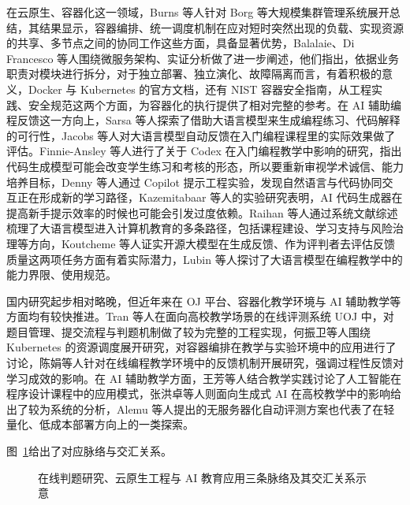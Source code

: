 在云原生、容器化这一领域，Burns 等人针对 Borg 等大规模集群管理系统展开总结，其结果显示，容器编排、统一调度机制在应对短时突然出现的负载、实现资源的共享、多节点之间的协同工作这些方面，具备显著优势\cite{burns2016borg}，Balalaie、Di Francesco 等人围绕微服务架构、实证分析做了进一步阐述，他们指出，依据业务职责对模块进行拆分，对于独立部署、独立演化、故障隔离而言，有着积极的意义\cite{balalaie2016microservices,difrancesco2019microservices}，Docker 与 Kubernetes 的官方文档，还有 NIST 容器安全指南，从工程实践、安全规范这两个方面，为容器化的执行提供了相对完整的参考\cite{dockerdocs,kubernetesdocs,nist201716800190}。在 AI 辅助编程反馈这一方向上，Sarsa 等人探索了借助大语言模型来生成编程练习、代码解释的可行性\cite{sarsa2022llm}，Jacobs 等人对大语言模型自动反馈在入门编程课程里的实际效果做了评估\cite{jacobs2024feedback}。Finnie-Ansley 等人进行了关于 Codex 在入门编程教学中影响的研究，指出代码生成模型可能会改变学生练习和考核的形态，所以要重新审视学术诚信、能力培养目标\cite{finnieansley2022robots}，Denny 等人通过 Copilot 提示工程实验，发现自然语言与代码协同交互正在形成新的学习路径\cite{denny2023conversing}，Kazemitabaar 等人的实验研究表明，AI 代码生成器在提高新手提示效率的时候也可能会引发过度依赖\cite{kazemitabaar2023chi}。Raihan 等人通过系统文献综述梳理了大语言模型进入计算机教育的多条路径，包括课程建设、学习支持与风险治理等方向\cite{raihan2025llmcsed}，Koutcheme 等人证实开源大模型在生成反馈、作为评判者去评估反馈质量这两项任务方面有着实际潜力\cite{koutcheme2024evaluatinglm,koutcheme2024openfeedbackiticse}，Lubin 等人探讨了大语言模型在编程教学中的能力界限、使用规范\cite{lubin2025llm}。

国内研究起步相对略晚，但近年来在 OJ 平台、容器化教学环境与 AI 辅助教学等方面均有较快推进。Tran 等人在面向高校教学场景的在线评测系统 UOJ 中，对题目管理、提交流程与判题机制做了较为完整的工程实现\cite{tran2013uoj}，何振卫等人围绕 Kubernetes 的资源调度展开研究，对容器编排在教学与实验环境中的应用进行了讨论\cite{hezhenwei2020kubernetes}，陈娟等人针对在线编程教学环境中的反馈机制开展研究，强调过程性反馈对学习成效的影响\cite{chenjuan2020online}。在 AI 辅助教学方面，王芳等人结合教学实践讨论了人工智能在程序设计课程中的应用模式\cite{wangfang2023ai}，张洪卓等人则面向生成式 AI 在高校教学中的影响给出了较为系统的分析\cite{zhanghongzhuo2024genai}，Alemu 等人提出的无服务器化自动评测方案也代表了在轻量化、低成本部署方向上的一类探索\cite{alemu2023serverless}。

图~\ref{fig:ch1-research-map}给出了对应脉络与交汇关系。

\begin{figure}[htbp]
  \centering
  \resizebox{0.88\textwidth}{!}{}
  \caption{在线判题研究、云原生工程与 AI 教育应用三条脉络及其交汇关系示意}
  \label{fig:ch1-research-map}
\end{figure}

